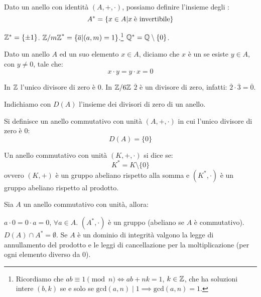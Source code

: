 \documentclass[11pt]{scrartcl}
\begin{document}
\begin{definition}
Dato un anello con identità $(A,+,\cdot)$, possiamo definire l'insieme degli :
	\[ A^* = \left\{x \in A \middle| x \; \text{è invertibile}\right\}
	\]
\end{definition}

\begin{example}
	\listhack
	\begin{itemize}
	\ii $\mathbb Z^* = \{\pm 1\}$.
	\ii ${{\mathbb Z}/m{\mathbb Z}}^{*} = \{\overline{a} | (a,m) = 1\}$.\footnote{Ricordiamo che $ab \equiv 1 \pmod n \iff ab + nk = 1$, $k \in \mathbb Z$, che ha soluzioni intere $(b,k)$ se e solo se $\text{gcd}(a,n) \mid 1 \implies \text{gcd}(a,n)=1$.}
	\ii $\mathbb Q^* = \mathbb Q \setminus \{0\}$.
	\end{itemize}
\end{example}

\begin{definition}
Dato un anello $A$ ed un suo elemento $x \in A$, diciamo che $x$ è un  se esiste $y \in A$, con $y \ne 0$, tale che:
	\[ x \cdot y = y \cdot x = 0
	\]
\end{definition}

\begin{example}
	\listhack
	\begin{itemize}
	\ii In $\mathbb Z$ l'unico divisore di zero è $0$.
	\ii In $\mathbb Z/6\mathbb Z$ $\overline 2$ è un divisore di zero, infatti: $\overline 2 \cdot \overline 3 = \overline 0$.
	\end{itemize}
\end{example}

Indichiamo con $D(A)$ l'insieme dei divisori di zero di un anello.

\begin{definition}
Si definisce  un anello commutativo con unità $(A,+,\cdot)$ in cui l'unico divisore di zero è $0$:
	\[ D(A) = \{0\}
	\]
\end{definition}

\begin{definition}
Un anello commutativo con unità $(K,+,\cdot)$ si dice  se:
	\[ K^* = K \setminus \{0\}
	\]
ovvero $(K,+)$ è un gruppo abeliano rispetto alla somma e $(K^*, \cdot)$ è un gruppo abeliano rispetto al prodotto.
\end{definition}

\begin{theorem}
\label{r:prop}
Sia $A$ un anello commutativo con unità, allora:
	\begin{enumerate}[(1)]
	\ii $a \cdot 0 = 0 \cdot a = 0$, $\forall a \in A$.
	\ii $(A^*, \cdot)$ è un gruppo (abeliano se $A$ è commutativo).
	\ii $D(A) \cap A^* = \emptyset$.
	\ii Se $A$ è un dominio di integrità valgono la legge di annullamento del prodotto e le leggi di cancellazione per la moltiplicazione (per ogni elemento diverso da $0$).
	\end{enumerate}
\end{theorem}
\end{document}
